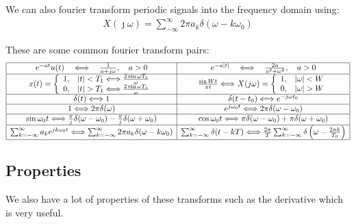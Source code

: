 \documentclass[12pt,letterpaper]{article} \usepackage{amsmath} \usepackage{graphicx} \usepackage[margin=1in]{geometry} \usepackage{longtable}  \usepackage{amssymb}
\begin{document}
	We can also fourier transform periodic signals into the frequency domain using:
	\begin{align}
		X(\jmath \omega) = \sum^\infty_{-\infty}2\pi a_k \delta(\omega - k\omega_0)
	\end{align}
	
	These are some common fourier transform pairs:
	\[
	\begin{array}{|c|c|}
		\hline
		e^{-a t} u(t) \quad \Longleftrightarrow \quad \frac{1}{a + j\omega},\quad a>0 &
		e^{-a|t|} \quad \Longleftrightarrow \quad \frac{2a}{a^2 + \omega^2},\quad a>0 \\
		
		\hline
		x(t) = \left\{
		\begin{array}{ll}
			1, & |t| < T_1 \Longleftrightarrow \frac{2\sin\omega T_1}{\omega} \\
			0, & |t| > T_1 \Longleftrightarrow \frac{2\sin\omega T_1}{\omega}
		\end{array}
		\right. &
		\frac{\sin Wt}{\pi t} \Longleftrightarrow X(j\omega) = 
		\left\{
		\begin{array}{ll}
			1, & |\omega| < W \\
			0, & |\omega| > W 
		\end{array}
		\right. \\
		
		\hline
		\delta(t) \Longleftrightarrow 1 & \delta(t-t_0) \Longleftrightarrow e^{-j\omega t_0} \\
		
		\hline
		1 \Longleftrightarrow 2\pi \delta(\omega) & e^{j\omega_0 t} \Longleftrightarrow 2\pi\delta(\omega-\omega_0) \\
		
		\hline
		\sin\omega_0 t \Longleftrightarrow \frac{\pi}{j}\delta(\omega-\omega_0) - \frac{\pi}{j}\delta(\omega+\omega_0) &
		\cos\omega_0 t \Longleftrightarrow \pi\delta(\omega-\omega_0) + \pi\delta(\omega+\omega_0) \\
		
		\hline
		\sum_{k=-\infty}^{\infty} a_k e^{j k \omega_0 t} \Longleftrightarrow \sum_{k=-\infty}^{\infty} 2\pi a_k \delta(\omega - k \omega_0) &
		\sum_{k=-\infty}^{\infty}\delta(t - kT) \Longleftrightarrow \frac{2\pi}{T} \sum_{k=-\infty}^{\infty} \delta\left(\omega - \frac{2\pi k}{T_0}\right) \\
		
		\hline
	\end{array}
	\]
	
	\subsection{Properties}
	We also have a lot of properties of these transforms such as the derivative which is very useful.
	
\end{document}
